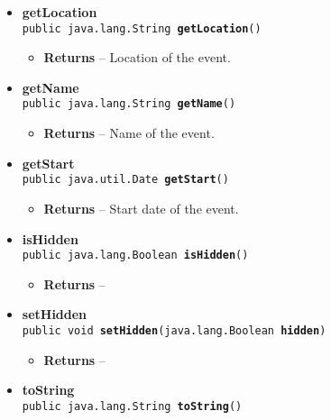 \documentclass[11pt,a4paper]{report}
\begin{document}
{{{\begin{itemize}
{\begin{itemize}
{Returns a link to google maps with the building where the event takes place selected
}
\end{itemize}
}%
\item{ 
{\bf  getLocation}\\
\texttt{public java.lang.String\ {\bf  getLocation}()
\label{is.mpg.ruglan.data.CalEvent.getLocation()}}%
\begin{itemize}
\item{{\bf  Returns} -- 
Location of the event. 
}%
\end{itemize}
}%
\item{ 
{\bf  getName}\\
\texttt{public java.lang.String\ {\bf  getName}()
\label{is.mpg.ruglan.data.CalEvent.getName()}}%
\begin{itemize}
\item{{\bf  Returns} -- 
Name of the event. 
}%
\end{itemize}
}%
\item{ 
{\bf  getStart}\\
\texttt{public java.util.Date\ {\bf  getStart}()
\label{is.mpg.ruglan.data.CalEvent.getStart()}}%
\begin{itemize}
\item{{\bf  Returns} -- 
Start date of the event. 
}%
\end{itemize}
}%
\item{ 
{\bf  isHidden}\\
\texttt{public java.lang.Boolean\ {\bf  isHidden}()
\label{is.mpg.ruglan.data.CalEvent.isHidden()}}%
\begin{itemize}
\item{{\bf  Returns} -- 
 
}%
\end{itemize}
}%
\item{ 
{\bf  setHidden}\\
\texttt{public void\ {\bf  setHidden}(\texttt{java.lang.Boolean} {\bf  hidden})
\label{is.mpg.ruglan.data.CalEvent.setHidden(java.lang.Boolean)}}%
\begin{itemize}
\item{{\bf  Returns} -- 
 
}%
\end{itemize}
}%
\item{ 
{\bf  toString}\\
\texttt{public java.lang.String\ {\bf  toString}()
\label{is.mpg.ruglan.data.CalEvent.toString()}}%
}%
\end{itemize}
}
}
}
\end{document}
